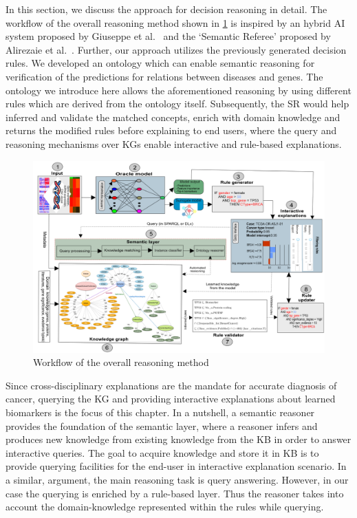 \hspace*{3.5mm} In this section, we discuss the approach for decision reasoning in detail. The workflow of the overall reasoning method shown in \cref{fig:reasoning_wf} is inspired by an hybrid AI system proposed by Giuseppe et al.~\cite{futia2020integration} and the `Semantic Referee' proposed by Alirezaie et al.~\cite{alirezaie2019semantic}. Further, our approach utilizes the previously generated decision rules. We developed an ontology which can enable semantic reasoning for verification of the predictions for relations between diseases and genes. The ontology we introduce here allows the aforementioned reasoning by using different rules which are derived from the ontology itself. Subsequently, the SR would help inferred and validate the matched concepts, enrich with domain knowledge and returns the modified rules before explaining to end users, where the query and reasoning mechanisms over KGs enable interactive and rule-based explanations. 

\begin{figure}
	\centering
	\includegraphics[scale=0.9]{images/reasoning_wf.png}
	\caption{Workflow of the overall reasoning method} 
	\label{fig:reasoning_wf}
	\vspace{-2mm}
\end{figure} 

\hspace*{3.5mm} Since cross-disciplinary explanations are the mandate for accurate diagnosis of cancer, querying the KG and providing interactive explanations about learned biomarkers is the focus of this chapter. In a nutshell, a semantic reasoner provides the foundation of the semantic layer, where a reasoner infers and produces new knowledge from existing knowledge from the KB in order to answer interactive queries. 
The goal to acquire knowledge and store it in KB is to provide querying facilities for the end-user in interactive explanation scenario. In a similar, argument, the main reasoning task is query answering. However, in our case the querying is enriched by a rule-based layer. Thus the reasoner takes into account the domain-knowledge represented within the rules while querying. 

